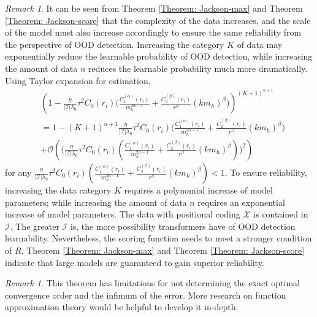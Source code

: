 \documentclass{article}
\theoremstyle{plain}
\theoremstyle{definition}
\theoremstyle{remark}
\newtheorem{remark}[theorem]{Remark}
\begin{document}
\begin{remark}
    It can be seen from Theorem \ref{Theorem: Jackson-max} and Theorem \ref{Theorem: Jackson-score} that the complexity of the data increases, and the scale of the model must also increase accordingly to ensure the same reliability from the perspective of OOD detection. Increasing the category $K$ of data may exponentially reduce the learnable probability of OOD detection, while increasing the amount of data $n$ reduces the learnable probability much more dramatically. Using Taylor expansion for estimation,
    \begin{equation}
    \begin{aligned}
        &\left(1-\frac{\eta}{|\mathcal{I}|\lambda_0}\tau^2 C_0(r_i)\bigl(\frac{C_1^{(\alpha)}(r_i)}{m_h^{2\alpha-1}}+\frac{C_2^{(\beta )}(r_i)}{r^{\beta}}(km_h)^{\beta}\bigr)\right)^{(K+1)^{n+1}}\\
        &= 1-(K+1)^{n+1}\frac{\eta}{|\mathcal{I}|\lambda_0}\tau^2 C_0(r_i)\bigl(\frac{C_1^{(\alpha)}(r_i)}{m_h^{2\alpha-1}}+\frac{C_2^{(\beta )}(r_i)}{r^{\beta}}(km_h)^{\beta}\bigr) \\
        &+ \mathcal{O}\left(\bigl(\frac{\eta}{|\mathcal{I}|\lambda_0}\tau^2 C_0(r_i)(\frac{C_1^{(\alpha)}(r_i)}{m_h^{2\alpha-1}}+\frac{C_2^{(\beta )}(r_i)}{r^{\beta}}(km_h)^{\beta})\bigr)^2\right)
    \end{aligned}
    \end{equation}
    for any $\frac{\eta}{|\mathcal{I}|\lambda_0}\tau^2 C_0(r_i)(\frac{C_1^{(\alpha)}(r_i)}{m_h^{2\alpha-1}}+\frac{C_2^{(\beta )}(r_i)}{r^{\beta}}(km_h)^{\beta})<1$. To ensure reliability, increasing the data category $K$ requires a polynomial increase of model parameters; while increasing the amount of data $n$ requires an exponential increase of model parameters. The data with positional coding $\mathcal{X}$ is contained in $\mathcal{I}$. The greater $\mathcal{I}$ is, the more possibility transformers have of OOD detection learnability. Nevertheless, the scoring function needs to meet a stronger condition of $R$. Theorem \ref{Theorem: Jackson-max} and Theorem \ref{Theorem: Jackson-score} indicate that large models are guaranteed to gain superior reliability.
\end{remark}
\begin{remark}
    This theorem has limitations for not determining the exact optimal convergence order and the infimum of the error. More research on function approximation theory would be helpful to develop it in-depth.
\end{remark}
\end{document}
